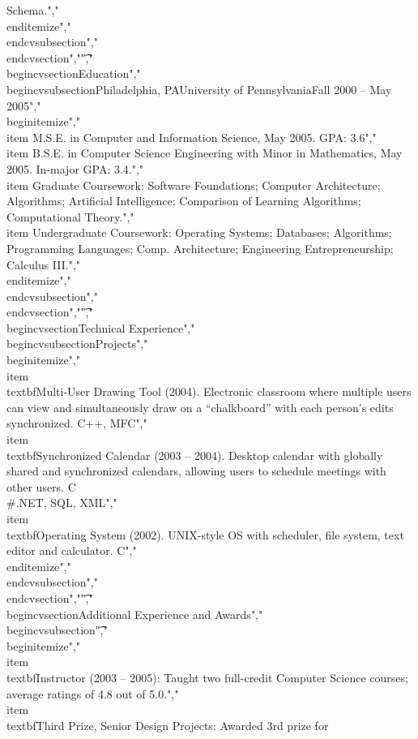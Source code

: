 Schema.","\t\t\t\\end{itemize}","\t\t\\end{cvsubsection}","\t\\end{cvsection}","\t","\t\\begin{cvsection}{Education}","\t\t\\begin{cvsubsection}{Philadelphia, PA}{University of Pennsylvania}{Fall 2000 -- May 2005}","\t\t\t\\begin{itemize}","\t\t\t\t\\item M.S.E. in Computer and Information Science, May 2005. GPA: 3.6","\t\t\t\t\\item B.S.E. in Computer Science Engineering with Minor in Mathematics, May 2005.  In-major GPA: 3.4.","\t\t\t\t\\item Graduate Coursework: Software Foundations; Computer Architecture; Algorithms; Artificial Intelligence; Comparison of Learning Algorithms; Computational Theory.","\t\t\t\t\\item Undergraduate Coursework: Operating Systems; Databases; Algorithms; Programming Languages; Comp. Architecture; Engineering Entrepreneurship; Calculus III.","\t\t\t\\end{itemize}","\t\t\\end{cvsubsection}","\t\\end{cvsection}","\t","\t\\begin{cvsection}{Technical Experience}","\t\t\\begin{cvsubsection}{Projects}{}{}","\t\t\t\\begin{itemize}","\t\t\t\t\\item \\textbf{Multi-User Drawing Tool} (2004). Electronic classroom where multiple users can view and simultaneously draw on a “chalkboard” with each person’s edits synchronized.  C++, MFC","\t\t\t\t\\item \\textbf{Synchronized Calendar} (2003 – 2004). Desktop calendar with globally shared and synchronized calendars, allowing users to schedule meetings with other users.  C\\#.NET, SQL, XML","\t\t\t\t\\item \\textbf{Operating System} (2002).  UNIX-style OS with scheduler, file system, text editor and calculator. C","\t\t\t\\end{itemize}","\t\t\\end{cvsubsection}","\t\\end{cvsection}","\t","\t\\begin{cvsection}{Additional Experience and Awards}","\t\t\\begin{cvsubsection}{}{}{}\t","\t\t\t\\begin{itemize}","\t\t\t\t\\item \\textbf{Instructor (2003 – 2005):} Taught two full-credit Computer Science courses; average ratings of 4.8 out of 5.0.","\t\t\t\t\\item \\textbf{Third Prize, Senior Design Projects:} Awarded 3rd prize for 